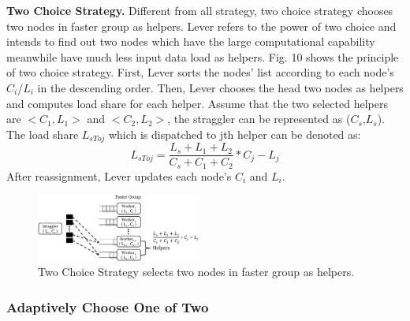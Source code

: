 \documentclass[10pt,conference,compsocconf,letterpaper]{IEEEtran}
\begin{document}
  \textbf{Two Choice Strategy.} Different from all strategy, two choice strategy chooses two nodes in faster group as helpers. Lever refers to the power of two choice\cite{Mitzenmacher1996} and intends to find out two nodes which have the large computational capability meanwhile have much less input data load as helpers. Fig. 10 shows the principle of two choice strategy. First, Lever sorts the nodes' list according to each node's \emph{$C_i$}/\emph{$L_i$} in the descending order. Then, Lever chooses the head two nodes as helpers and computes load share for each helper. Assume that the two selected helpers are $<C_1, L_1>$ and $<C_2, L_2>$, the straggler can be represented as (\emph{$C_s$},\emph{$L_s$}). The load share \emph{{$L_{sToj}$}} which is dispatched to jth helper can be denoted as:
  \begin{equation}
  L_{sToj} = \frac{L_s + L_1 + L_2}{C_s + C_1 + C_2}*C_j - L_j
  \end{equation}
  After reassignment, Lever updates each node's $C_i$ and $L_i$.
  \begin{figure}[htbp]
    \centering
    \includegraphics[width=0.48\textwidth]{FigureS2}
    \caption{Two Choice Strategy selects two nodes in faster group as helpers.}
    \label{Fig. 10:}
  \end{figure}

\subsubsection{Adaptively Choose One of Two}
\end{document}

